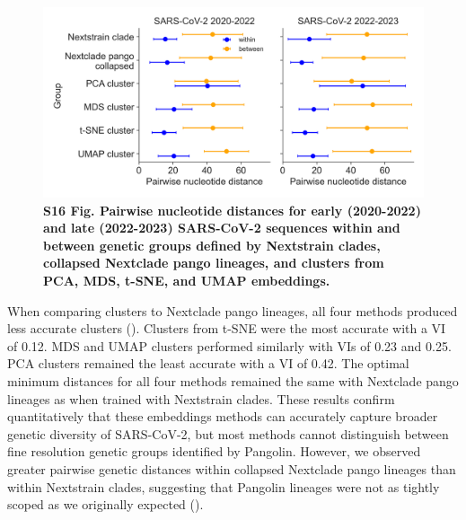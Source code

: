 \documentclass[10pt,letterpaper]{article}
\begin{document}
\begin{figure}[!h]
\includegraphics[width=\columnwidth]{figures/within_between_sars.png}
\caption*{{\bf S16 Fig. Pairwise nucleotide distances for early (2020-2022) and late (2022-2023) SARS-CoV-2 sequences within and between genetic groups defined by Nextstrain clades, collapsed Nextclade pango lineages, and clusters from PCA, MDS, t-SNE, and UMAP embeddings.}}
\end{figure}

When comparing clusters to Nextclade pango lineages, all four methods produced less accurate clusters ().
Clusters from t-SNE were the most accurate with a VI of 0.12.
MDS and UMAP clusters performed similarly with VIs of 0.23 and 0.25.
PCA clusters remained the least accurate with a VI of 0.42.
The optimal minimum distances for all four methods remained the same with Nextclade pango lineages as when trained with Nextstrain clades.
These results confirm quantitatively that these embeddings methods can accurately capture broader genetic diversity of SARS-CoV-2, but most methods cannot distinguish between fine resolution genetic groups identified by Pangolin.
However, we observed greater pairwise genetic distances within collapsed Nextclade pango lineages than within Nextstrain clades, suggesting that Pangolin lineages were not as tightly scoped as we originally expected ().
\end{document}
